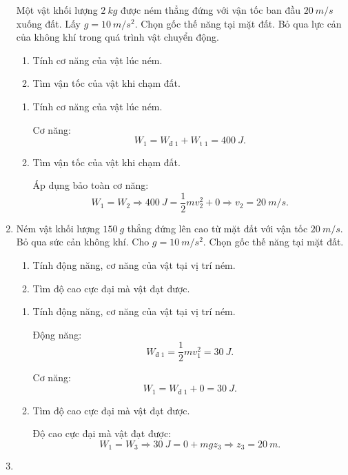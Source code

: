 \begin{enumerate}[label=\bfseries Câu \arabic*:, leftmargin=1.5cm]
	
	{
		Một vật khối lượng $\SI{2}{kg}$ được ném thẳng đứng với vận tốc ban đầu $\SI{20}{m/s}$ xuống đất. Lấy $g=\SI{10}{m/s^2}$. Chọn gốc thế năng tại mặt đất. Bỏ qua lực cản của không khí trong quá trình vật chuyển động.
		\begin{enumerate}[label=\alph*)]
			\item Tính cơ năng của vật lúc ném.
			\item Tìm vận tốc của vật khi chạm đất.
		\end{enumerate}
	}
	
	\hideall
	{	
		\begin{enumerate}[label=\alph*)]
			\item Tính cơ năng của vật lúc ném.
			
			Cơ năng:
			$$W_1 = W_\text{đ 1} + W_\text{t 1} = \SI{400}{J}.$$
			\item Tìm vận tốc của vật khi chạm đất.
			
			Áp dụng bảo toàn cơ năng:
			$$W_1 = W_2 \Rightarrow \SI{400}{J} = \dfrac{1}{2}mv_2^2 + 0 \Rightarrow v_2 = \SI{20}{m/s}.$$
		\end{enumerate}
	}
	
	\item {}
	
	
	{
		Ném vật khối lượng $\SI{150}{g}$ thẳng đứng lên cao từ mặt đất với vận tốc $\SI{20}{m/s}$. Bỏ qua sức cản không khí. Cho $g=\SI{10}{m/s^2}$. Chọn gốc thế năng tại mặt đất.
		\begin{enumerate}[label=\alph*)]
			\item Tính động năng, cơ năng của vật tại vị trí ném.
			\item Tìm độ cao cực đại mà vật đạt được.
		\end{enumerate}
	}
	
	\hideall
	{	
		\begin{enumerate}[label=\alph*)]
			\item Tính động năng, cơ năng của vật tại vị trí ném.
			
			Động năng:
			$$W_\text{đ 1} = \dfrac{1}{2}mv_1^2 = \SI{30}{J}.$$
			
			Cơ năng:
			$$W_1 = W_\text{đ 1} + 0 = \SI{30}{J}.$$
			\item Tìm độ cao cực đại mà vật đạt được.
			
			Độ cao cực đại mà vật đạt được:
			$$W_1 = W_3 \Rightarrow \SI{30}{J} = 0 + mgz_3 \Rightarrow z_3 = \SI{20}{m}.$$
		\end{enumerate}
	}
	\item {}
	

\end{enumerate}
